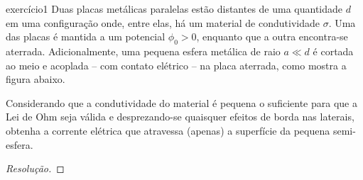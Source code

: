 \begin{exercício}{}{exercício1}
    Duas placas metálicas paralelas estão distantes de uma quantidade \(d\) em uma configuração onde, entre elas, há um material de condutividade \(\sigma\). Uma das placas é mantida a um potencial \(\phi_0 > 0\), enquanto que a outra encontra-se aterrada. Adicionalmente, uma pequena esfera metálica de raio \(a\ll d\) é cortada ao meio e acoplada -- com contato elétrico -- na placa aterrada, como mostra a figura abaixo.
    \begin{center}
    \end{center}
    Considerando que a condutividade do material é pequena o suficiente para que a Lei de Ohm seja válida e desprezando-se quaisquer efeitos de borda nas laterais, obtenha a corrente elétrica que atravessa (apenas) a superfície da pequena semi-esfera.
\end{exercício}
\begin{proof}[Resolução]

\end{proof}
